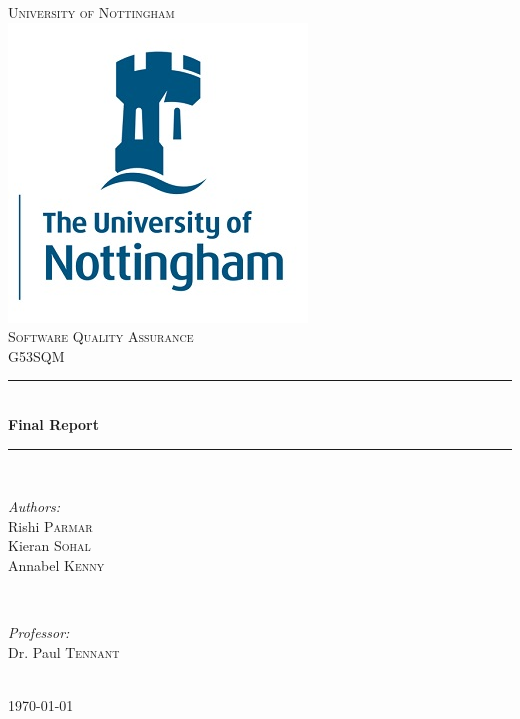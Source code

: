 \documentclass[12pt]{article}
\begin{document}
\begin{titlepage}

\newcommand{\HRule}{\rule{\linewidth}{0.5mm}}

\center 
\textsc{\LARGE University of Nottingham}\\[1.5cm]
\includegraphics[scale=0.4]{images/uon.jpg}\\[1cm]
\textsc{\Large Software Quality Assurance}\\[0.5cm]
\textsc{\large G53SQM}\\[0.5cm]

\HRule \\[0.4cm]
{ \huge \bfseries Final Report}\\[0.4cm]
\HRule \\[1.5cm]

\begin{minipage}{0.4\textwidth}
\begin{flushleft}
\emph{Authors:}\\
\vspace{0.1cm}
Rishi \textsc{Parmar}\\
Kieran \textsc{Sohal}\\
Annabel \textsc{Kenny}
\end{flushleft}
\end{minipage}
~
\begin{minipage}{0.4\textwidth}
\begin{flushright} 
\emph{Professor:} \\
Dr. Paul \textsc{Tennant}
\end{flushright}
\end{minipage}\\[2cm]

{\large \today}\\[2cm]


\vfill

\end{titlepage}
\end{document}
